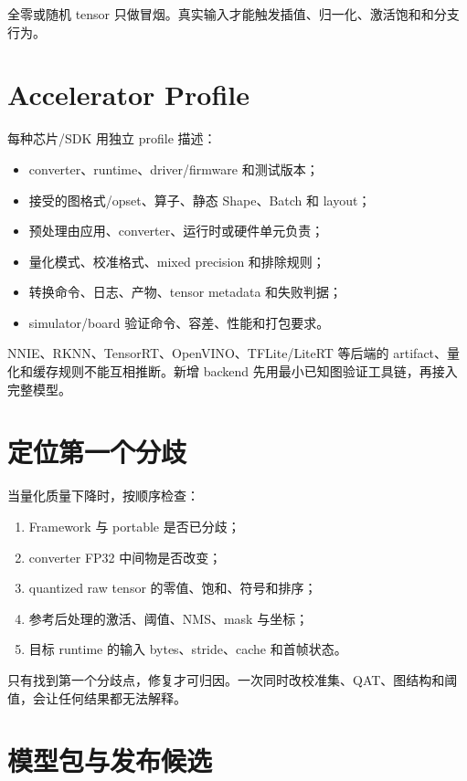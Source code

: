 全零或随机 tensor 只做冒烟。真实输入才能触发插值、归一化、激活饱和和分支行为。

\section{Accelerator Profile}

每种芯片/SDK 用独立 profile 描述：

\begin{itemize}
  \item converter、runtime、driver/firmware 和测试版本；
  \item 接受的图格式/opset、算子、静态 Shape、Batch 和 layout；
  \item 预处理由应用、converter、运行时或硬件单元负责；
  \item 量化模式、校准格式、mixed precision 和排除规则；
  \item 转换命令、日志、产物、tensor metadata 和失败判据；
  \item simulator/board 验证命令、容差、性能和打包要求。
\end{itemize}

NNIE、RKNN、TensorRT、OpenVINO、TFLite/LiteRT 等后端的 artifact、量化和缓存规则不能互相推断。新增 backend 先用最小已知图验证工具链，再接入完整模型。

\section{定位第一个分歧}

当量化质量下降时，按顺序检查：

\begin{enumerate}
  \item Framework 与 portable 是否已分歧；
  \item converter FP32 中间物是否改变；
  \item quantized raw tensor 的零值、饱和、符号和排序；
  \item 参考后处理的激活、阈值、NMS、mask 与坐标；
  \item 目标 runtime 的输入 bytes、stride、cache 和首帧状态。
\end{enumerate}

只有找到第一个分歧点，修复才可归因。一次同时改校准集、QAT、图结构和阈值，会让任何结果都无法解释。

\section{模型包与发布候选}

